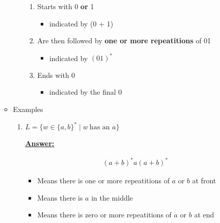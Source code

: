 \documentclass[12pt]{article}
\begin{document}
\begin{enumerate}[a.]
\begin{itemize}
\begin{itemize}
            \bigskip

            \begin{enumerate}[1.]
                \item Starts with 0 \textbf{or} 1
                \begin{itemize}
                    \item indicated by (0 + 1)
                \end{itemize}
                \item Are then followed by \textbf{one or more repeatitions} of 01
                \begin{itemize}
                    \item indicated by $(01)^*$
                \end{itemize}
                \item Ends with 0
                \begin{itemize}
                    \item indicated by the final 0
                \end{itemize}
            \end{enumerate}
        \end{itemize}

        \item Examples
        \begin{enumerate}[1.]
            \item $L = \{w \in \{a,b\}^* \mid w\:\text{has an $a$} \}$

            \bigskip

            \begin{mdframed}
                \underline{\textbf{Answer:}}

                \begin{align}
                (a+b)^*a(a+b)^*
                \end{align}

                \bigskip

                \begin{itemize}
                    \item Means there is one or more repeatitions of $a$ or $b$ at front
                    \item Means there is $a$ in the middle
                    \item Means there is zero or more repeatitions of $a$ or $b$ at end
                \end{itemize}
            \end{mdframed}


\end{enumerate}
\end{itemize}
\end{enumerate}
\end{document}
